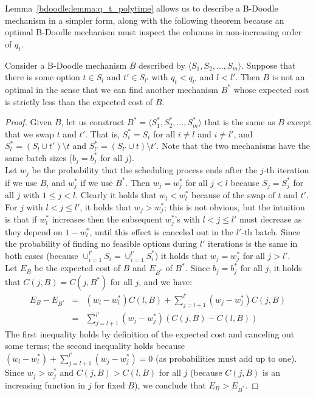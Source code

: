 	Lemma~\ref{bdoodle:lemma:q_t_polytime} allows us to describe a B-Doodle mechanism in a simpler form, along with the following theorem because an optimal B-Doodle mechanism must inspect the columns in non-increasing order of $q_t$.
	\begin{theorem} \label{bdoodle:thm:exchange_argument}
	Consider a B-Doodle mechanism $B$ described by $\langle S_1, S_2, \dots, S_m \rangle$. Suppose that there is some option $t \in S_l$ and $t'\in S_{l'}$ with $q_t < q_{t'}$ and $l < l'$. Then $B$ is not an optimal in the sense that we can find another mechanism $B^*$ whose expected cost is strictly less than the expected cost of $B$.
	\end{theorem}
	\begin{proof}
	Given $B$, let us construct $B^* = \langle S^*_1, S^*_2, \dots, S^*_m \rangle$ that is the same as $B$ except that we swap $t$ and $t'$. That is, $S^*_i = S_i$ for all $i \neq l$ and $i\neq l'$, and $S^*_{l} = (S_l \cup t') \setminus t$ and $S^*_{l'} = (S_{l'} \cup t) \setminus t'$. Note that the two mechanisms have the same batch sizes ($b_j = b^*_j$ for all $j$). \\

	Let $w_j$ be the probability that the scheduling process ends after the $j$-th iteration if we use $B$, and $w_j^*$ if we use $B^*$. Then $w_j = w_j^*$ for all $j < l$ because $S_j = S^*_j$ for all $j$ with $1 \leq j < l$. Clearly it holds that $w_l < w_l^*$ because of the swap of $t$ and $t'$. For $j$ with $l < j \leq l'$, it holds that $w_j > w_j^*$; this is not obvious, but the intuition is that if $w_l^*$ increases then the subsequent $w_j^*$'s with $l < j \leq l'$ must decrease as they depend on $1-w_l^*$, until this effect is canceled out in the $l'$-th batch. Since the probability of finding no feasible options during $l'$ iterations is the same in both cases (because $\cup_{i=1}^{l'} S_i = \cup_{i=1}^{l'}S^*_i$) it holds that $w_j = w_j^*$ for all $j > l'$. \\

	Let $E_B$ be the expected cost of $B$ and $E_{B^*}$ of $B^*$. Since $b_j = b^*_j$ for all $j$, it holds that $C(j, B) = C(j, B^*)$ for all $j$, and we have:
	\begin{eqnarray*}
		E_B - E_{B^*}
		&=& (w_l - w_l^*)C(l, B) + \sum_{j=l+1}^{l'} (w_j - w_j^*)C(j, B) \\
		&=& \sum_{j=l+1}^{l'} (w_j - w_j^*)(C(j, B) - C(l, B))
	\end{eqnarray*}
	The first inequality holds by definition of the expected cost and canceling out some terms; the second inequality holds because $(w_l - w_l^*) + \sum_{j=l+1}^{l'} (w_j - w_j^*) = 0$ (as probabilities must add up to one). Since $w_j > w_j^*$ and $C(j, B) > C(l, B)$ for all $j$ (because $C(j, B)$ is an increasing function in $j$ for fixed $B$), we conclude that $E_{B} > E_{B^*}$.
	\end{proof}
